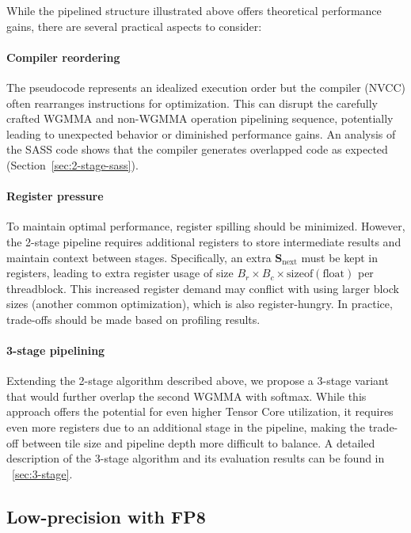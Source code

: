 \documentclass{article}
\newcommand{\vS}{\mathbf{S}}
\begin{document}
  While the pipelined structure illustrated above offers theoretical performance gains, there are several practical aspects to consider:
  \paragraph{Compiler reordering}
  The pseudocode represents an idealized execution order but the compiler (NVCC) often rearranges instructions for optimization.
  This can disrupt the carefully crafted WGMMA and non-WGMMA operation pipelining sequence, potentially leading to unexpected behavior or diminished performance gains. An analysis of the SASS code shows that the compiler generates overlapped code as expected (Section~\ref{sec:2-stage-sass}).
  \paragraph{Register pressure}
  To maintain optimal performance, register spilling should be minimized.
  However, the 2-stage pipeline requires additional registers to store intermediate results and maintain context between stages.
  Specifically, an extra $\vS_{\mathrm{next}}$ must be kept in registers, leading to extra register usage of size $B_r \times B_c \times \text{sizeof}(\text{float})$ per threadblock.
  This increased register demand may conflict with using larger block sizes (another common optimization), which is also register-hungry.
  In practice, trade-offs should be made based on profiling results.
  \paragraph{3-stage pipelining} Extending the 2-stage algorithm described above, we propose a 3-stage variant
  that would further overlap the second WGMMA with softmax.
  While this approach offers the potential for even higher Tensor Core utilization,
  it requires even more registers due to an additional stage in the pipeline,
  making the trade-off between tile size and pipeline depth more difficult to balance.
  A detailed description of the 3-stage algorithm and its evaluation results can be found in ~\cref{sec:3-stage}.

\subsection{Low-precision with FP8}
\label{sec:algofp8}
\end{document}
